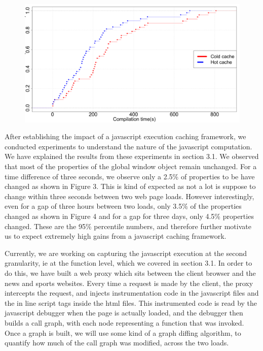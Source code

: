 \begin{figure}[t]
\centering
\includegraphics[width=0.9\columnwidth]{figs/chrome_compile.png}
\label{fig:compile_p2}
\end{figure}

After establishing the impact of a javascript execution caching framework, we conducted
experiments to understand the nature of the javascript computation. We have explained the
results from these experiments in section 3.1. 
We observed that most of the properties of the global window object remain unchanged.
For a time difference of three seconds, we observe only a 2.5\% of properties to be have
changed as shown in Figure 3. This is kind of expected as not a lot is suppose to change within three seconds 
between two web page loads. However interestingly, even for a gap of three hours between
two loads, only 3.5\% of the properties changed as shown in Figure 4 and for a gap
 for three days, only 4.5\% 
properties changed. These are the 95\% percentile numbers, and therefore 
further motivate us to expect extremely high gains from a javascript caching
framework. 


Currently, we are working on capturing the javascript execution at the second granularity,
ie at the function level, which we covered in section 3.1. In order to do this, we have built
a web proxy which sits between the client browser and the news and sports websites. Every time 
a request is made by the client, the proxy intercepts the request, and injects instrumentation
code in the javascript files and the in line script tags inside the html files. 
This instrumented code is read by the javascript debugger when the page is actually loaded, and 
the debugger then builds a call graph, with each node representing a function that was invoked. 
Once a graph is built, we will use some kind of a graph diffing algorithm, to quantify
how much of the call graph was modified, across the two loads. 


